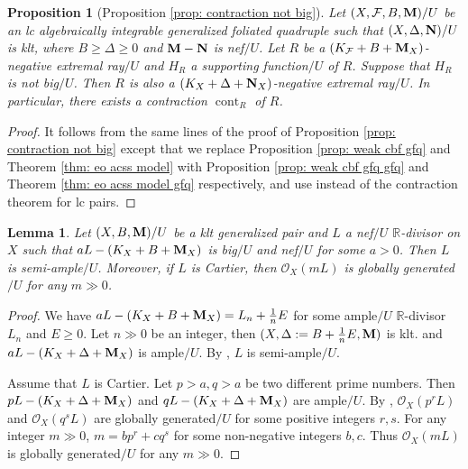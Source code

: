 \documentclass[11pt]{amsart}
\numberwithin{equation}{section}
\newcommand{\Mm}{{\bf{M}}}
\newcommand{\Nn}{{\bf{N}}}
\newcommand{\Rr}{\mathbb{R}}
\newcommand{\cont}{\operatorname{cont}}
\newcommand{\Ff}{\mathcal{F}}
\newtheorem{lem}[thm]{Lemma}
\newtheorem{prop}[thm]{Proposition}
\theoremstyle{definition}
\theoremstyle{definition}
\theoremstyle{definition}
\begin{document}
\begin{prop}[Proposition \ref{prop: contraction not big}]\label{prop: contraction not big gfq}
    Let $(X,\Ff,B,\Mm)/U$ be an lc algebraically integrable generalized foliated quadruple such that $(X,\Delta,\Nn)/U$ is klt, where $B\geq\Delta\geq 0$ and $\Mm-\Nn$ is nef$/U$. Let $R$ be a $(K_{\Ff}+B+\Mm_X)$-negative extremal ray$/U$ and $H_R$ a supporting function$/U$ of $R$. Suppose that $H_R$ is not big$/U$. Then $R$ is also a $(K_X+\Delta+\Nn_X)$-negative extremal ray$/U$. In particular, there exists a contraction $\cont_R$ of $R$.
\end{prop}
\begin{proof}
    It follows from the same lines of the proof of Proposition \ref{prop: contraction not big} except that we replace Proposition \ref{prop: weak cbf gfq} and Theorem \ref{thm: eo acss model} with Proposition \ref{prop: weak cbf gfq gfq} and Theorem \ref{thm: eo acss model gfq} respectively, and use \cite[Theorem 2.2.1(4)]{CHLX23} instead of the contraction theorem for lc pairs.
\end{proof}

\begin{lem}\label{lem: klt bpf}
    Let $(X,B,\Mm)/U$ be a klt generalized pair and $L$ a nef$/U$ $\Rr$-divisor on $X$ such that $aL-(K_X+B+\Mm_X)$ is big$/U$ and nef$/U$ for some $a>0$. Then $L$ is semi-ample$/U$. Moreover, if $L$ is Cartier, then $\mathcal{O}_X(mL)$ is globally generated$/U$ for any $m\gg 0$.
\end{lem}
\begin{proof}
We have $aL-(K_X+B+\Mm_X)=L_n+\frac{1}{n}E$ for some ample$/U$ $\Rr$-divisor $L_n$ and $E\geq 0$. Let $n\gg 0$ be an integer, then $(X,\Delta:=B+\frac{1}{n}E,\Mm)$ is klt. and $aL-(K_X+\Delta+\Mm_X)$ is ample$/U$. By \cite[Theorem 2.2.7]{CHLX23}, $L$ is semi-ample$/U$.

Assume that $L$ is Cartier. Let $p>a,q>a$ be two different prime numbers. Then $pL-(K_X+\Delta+\Mm_X)$ and $qL-(K_X+\Delta+\Mm_X)$ are ample$/U$. By \cite[Theorems 2.2.6]{CHLX23}, $\mathcal{O}_X(p^rL)$ and $\mathcal{O}_X(q^sL)$ are globally generated$/U$ for some positive integers $r,s$. For any integer $m\gg0$, $m=bp^r+cq^s$ for some non-negative integers $b,c$. Thus $\mathcal{O}_X(mL)$ is globally generated$/U$ for any $m\gg 0$.
\end{proof}
\end{document}
